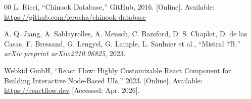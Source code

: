 \documentclass[conference]{IEEEtran}
\begin{document}
\begin{thebibliography}{00}
L. Ricci, ``Chinook Database,'' GitHub, 2016. [Online]. Available:
\url{https://github.com/lerocha/chinook-database}

A. Q. Jiang, A. Sablayrolles, A. Mensch, C. Bamford, D. S. Chaplot,
D. de las Casas, F. Bressand, G. Lengyel, G. Lample, L. Saulnier et al.,
``Mistral 7B,'' \textit{arXiv preprint arXiv:2310.06825}, 2023.

Webkid GmbH, ``React Flow: Highly Customizable React Component for Building
Interactive Node-Based UIs,'' 2023. [Online]. Available:
\url{https://reactflow.dev} [Accessed: Apr. 2026].

\end{thebibliography}
\end{document}
